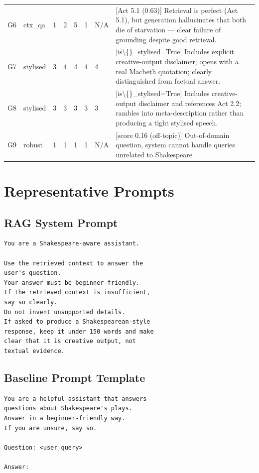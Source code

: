 \documentclass[10pt,conference]{IEEEtran}
\begin{document}
\begin{table}[h]
\begin{tabularx}{\textwidth}{llp{1.5cm}p{1.2cm}p{1.2cm}p{1.2cm}p{1.2cm}X}
G6 & ctx\_qa & 1 & 2 & 5 & 1 & N/A & [Act 5.1 (0.63)] Retrieval is perfect (Act 5.1), but generation hallucinates that both die of starvation --- clear failure of grounding despite good retrieval. \\
G7 & stylised & 3 & 4 & 4 & 4 & 4 & [is\textbackslash\{\}\_stylised=True] Includes explicit creative-output disclaimer; opens with a real Macbeth quotation; clearly distinguished from factual answer. \\
G8 & stylised & 3 & 3 & 3 & 3 & 3 & [is\textbackslash\{\}\_stylised=True] Includes creative-output disclaimer and references Act 2.2; rambles into meta-description rather than producing a tight stylised speech. \\
G9 & robust & 1 & 1 & 1 & 1 & N/A & [score 0.16 (off-topic)] Out-of-domain question, system cannot handle queries unrelated to Shakespeare \\
\bottomrule
\end{tabularx}
\end{table}

\section{Representative Prompts}
\label{app:prompts}

\subsection{RAG System Prompt}

\begin{lstlisting}[language={}]
You are a Shakespeare-aware assistant.

Use the retrieved context to answer the
user's question.
Your answer must be beginner-friendly.
If the retrieved context is insufficient,
say so clearly.
Do not invent unsupported details.
If asked to produce a Shakespearean-style
response, keep it under 150 words and make
clear that it is creative output, not
textual evidence.
\end{lstlisting}

\subsection{Baseline Prompt Template}

\begin{lstlisting}[language={}]
You are a helpful assistant that answers
questions about Shakespeare's plays.
Answer in a beginner-friendly way.
If you are unsure, say so.

Question: <user query>

Answer:
\end{lstlisting}
\end{document}
